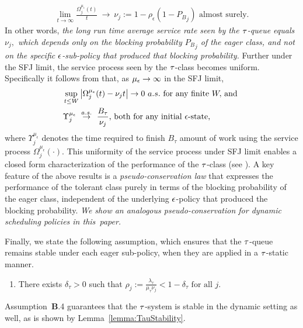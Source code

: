 \vspace{-5mm}
{\small \begin{align}
    \label{Eqn_nujs}
          \lim_{t \to \infty}  \frac{\Omega^{\mu_\epsilon}_{j}(t) }{t}
          \ \to \   \nu_j  := 1 - \rho_\epsilon( 1 - {P_B}_j)
          \text{ almost surely.}
        \end{align}}
      In other words, {\it the long run time average service rate seen by the
      ${\tau}$-queue equals $\nu_j,$ which depends only on the blocking
      probability ${P_B}_j$ of the eager class, and not on the specific
      ${ \epsilon }$-sub-policy that produced that blocking probability.} Further under
      the SFJ limit, the service process seen by the ${\tau}$-class becomes
      uniform. Specifically it follows from \cite[Theorem~1]{ANOR} that, as
      ${\mu_\epsilon} \to \infty$ in the SFJ limit,
\begin{align}
\nonumber
& \sup_{t \le W}  \left | \Omega^{\mu_\epsilon}_{j}(t)   - \nu_j t \right |  \to   0 \ a.s. \mbox{ for any finite $W,$ and } \\
& \Upsilon_j^{\mu_\epsilon}  \  \stackrel{a.s.}{\to}  \   \frac { B_\tau }{ \nu_j} \mbox{, both  for any  initial $\epsilon$-state, } \label{Eqn_Upsilon_conv}
\end{align}
  where $\Upsilon_j^{\mu_\epsilon}$ denotes the time required to
  finish $B_\tau$ amount of work using the service process
  $\Omega^{\mu_\epsilon}_{j}(\cdot)$.
  This uniformity of the service process under SFJ limit enables a
  closed form characterization of the performance of the ${\tau}$-class
  (see \cite[Theorems~2,3]{ANOR}). A key feature of the above results
  is a \emph{pseudo-conservation law} that expresses the performance
  of the tolerant class purely in terms of the blocking probability of
  the eager class, independent of the underlying ${ \epsilon }$-policy that
  produced the blocking probability. {\it We show an analogous
  pseudo-conservation for dynamic scheduling policies in this~paper.
}

%
Finally, we state the following assumption, which ensures that the
${\tau}$-queue remains stable under each
 eager sub-policy, when
they are applied in a ${\tau}$-static manner.

\begin{enumerate}[\textbf{B}.4] 
\item   {There exists $\delta_\tau  > 0$
  such that $\rho_{j} := \frac{ \lambda_\tau } { \mu_\tau \nu_j } < 1-\delta_\tau
  \mbox{ for all } j.$}
\end{enumerate}
Assumption~\textbf{B}.4 guarantees that the ${\tau}$-system is stable in
the dynamic setting as well, as is shown by
Lemma~\ref{lemma:TauStability}.

